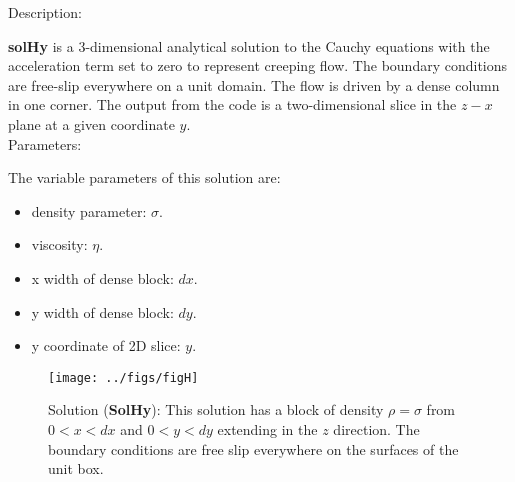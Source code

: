   {\large \fontB Description:}
  
  {\bf solHy} is a 3-dimensional analytical solution to the Cauchy equations with the acceleration term set to zero
  to represent creeping flow. The boundary conditions are free-slip everywhere on a unit domain. 
  The flow is driven by a dense column in one corner. The output from the code is a two-dimensional slice
  in the $z - x$ plane at a given coordinate $y$.
  \\

  {\large \fontB Parameters:}
 
  The variable parameters of this solution are:
  \begin{itemize}
    \item{density parameter: $ \sigma $.}
    \item{viscosity: $\eta$.}
    \item{x width of dense block: $dx$.}
    \item{y width of dense block: $dy$.}
    \item{y coordinate of 2D slice: $y$.}
    \end{itemize}

  \begin{SCfigure}[][h]
    \texttt{[image: ../figs/figH]}
    \caption[Short caption]{\label{figHy} 
      Solution ({\bf SolHy}):
      This solution has a block of density $\rho = \sigma$
       from $ 0 < x < dx $ and $ 0 < y < dy $ extending in the $z$ direction.
      The boundary conditions are free slip everywhere on the surfaces of the unit box.}
  \end{SCfigure} 
  

